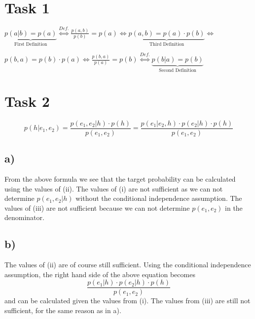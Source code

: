 \documentclass[%
   11pt,              %
   ngerman,           %
   a4paper,           %
   DIV11,             %
]{scrartcl}%
\begin{document}
\section*{Task 1}
$\underbrace{p(a| b) = p(a)}_{\text{First Definition}} \stackrel{Def.}{\iff}
\frac{p(a,b)}{p(b)} = p(a) \iff
\underbrace{p(a,b) = p(a) \cdot p(b)}_{\text{Third Definition}} \iff$ 

$p(b,a) = p(b) \cdot p(a) \iff 
\frac{p(b,a)}{p(a)} = p(b) \stackrel{Def.}{\iff}
\underbrace{p(b| a) = p(b)}_{\text{Second Definition}}$
\section*{Task 2}
\begin{equation*}
	p(h|e_1,e_2) = \frac{p(e_1,e_2|h) \cdot p(h)}{p(e_1,e_2)} = \frac{p(e_1|e_2,h) \cdot p(e_2|h) \cdot p(h)}{p(e_1,e_2)}
\end{equation*}
\subsection*{a)} From the above formula we see that the target probability can be calculated using the values of (ii). The values of (i) are not sufficient as we can not determine $p(e_1,e_2|h)$ without the conditional independence assumption. The values of (iii) are not sufficient because we can not determine $p(e_1,e_2)$ in the denominator.
\subsection*{b)} The values of (ii) are of course still sufficient. Using the conditional independence assumption, the right hand side of the above equation becomes
\begin{equation*}
\frac{p(e_1|h) \cdot p(e_2|h) \cdot p(h)}{p(e_1,e_2)}
\end{equation*}
and can be calculated given the values from (i). The values from (iii) are still not sufficient, for the same reason as in a).
\end{document}
